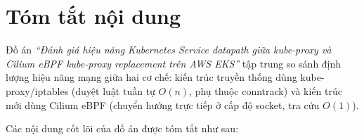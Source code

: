 
\chapter*{Tóm tắt nội dung}

Đồ án \textit{``Đánh giá hiệu năng Kubernetes Service datapath giữa kube-proxy và Cilium eBPF kube-proxy replacement trên AWS EKS''} tập trung so sánh định lượng hiệu năng mạng giữa hai cơ chế: kiến trúc truyền thống dùng kube-proxy/iptables (duyệt luật tuần tự $O(n)$, phụ thuộc conntrack) và kiến trúc mới dùng Cilium eBPF (chuyển hướng trực tiếp ở cấp độ socket, tra cứu $O(1)$).

Các nội dung cốt lõi của đồ án được tóm tắt như sau:

